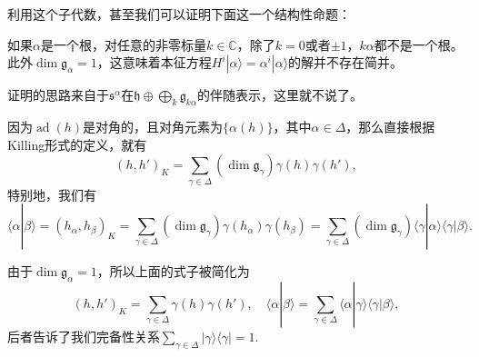 \documentclass[9pt]{extarticle}
\newcommand{\cc}{\mathbb{C}}
\newcommand{\lag}{{\mathfrak{g}}}
\DeclareMathOperator{\ad}{ad}
\begin{document}
利用这个子代数，甚至我们可以证明下面这一个结构性命题：

\pro 如果$\alpha$是一个根，对任意的非零标量$k\in \cc$，除了$k=0$或者$\pm 1$，$k\alpha$都不是一个根。此外$\dim \lag_{\alpha}=1$，这意味着本征方程$H^i|\alpha\rangle = \alpha^i|\alpha\rangle$的解并不存在简并。

证明的思路来自于$\mathfrak{s}^\alpha$在$\mathfrak{h} \oplus \bigoplus_k \lag_{k\alpha}$的伴随表示，这里就不说了。

\para 因为$\ad(h)$是对角的，且对角元素为$\{\alpha(h)\}$，其中$\alpha\in\Delta$，那么直接根据Killing形式的定义，就有
\[
	(h,h')_K=\sum_{\gamma \in \Delta}(\dim \lag_\gamma)\gamma(h)\gamma(h'),
\]
特别地，我们有
\[
	\langle \alpha|\beta \rangle=(h_\alpha,h_\beta)_K=\sum_{\gamma \in \Delta}(\dim \lag_\gamma)\gamma(h_\alpha)\gamma(h_\beta)=\sum_{\gamma \in \Delta}(\dim \lag_\gamma)\langle \gamma|\alpha\rangle\langle \gamma|\beta\rangle.
\]

由于$\dim \lag_{\alpha}=1$，所以上面的式子被简化为
\[
	(h,h')_K=\sum_{\gamma \in \Delta}\gamma(h)\gamma(h'),\quad \langle \alpha|\beta \rangle=\sum_{\gamma \in \Delta}\langle \alpha|\gamma\rangle\langle \gamma|\beta\rangle,
\]
后者告诉了我们完备性关系$\sum_{\gamma\in \Delta}|\gamma\rangle\langle \gamma|=1$.




\end{document}
